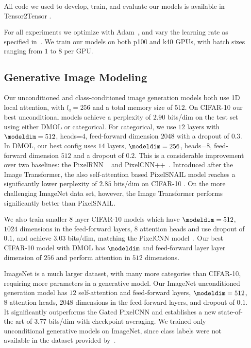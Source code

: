 All code we used to develop, train, and evaluate our models is available in Tensor2Tensor \citep{tensor2tensor}.

For all experiments we optimize with Adam~\citep{kingma2014adam}, and vary the learning rate as specified in~\cite{aiayn}. We train our models on both p100 and k40 GPUs, with batch sizes ranging from $1$ to $8$ per GPU.



\subsection{Generative Image Modeling}
Our unconditioned and class-conditioned image generation models both use 1D local attention, with $l_q=256$ and a total memory size of $512$.
On CIFAR-10 our best unconditional models achieve a perplexity of $2.90$ bits/dim on the test set using either DMOL or categorical. For categorical, we use $12$ layers with $\modeldim=512$, heads=$4$, feed-forward dimension $2048$ with a dropout of $0.3$. In DMOL, our best config uses $14$ layers, $\modeldim=256$, heads=$8$, feed-forward dimension $512$ and a dropout of $0.2$. This is a considerable improvement over two baselines: the PixelRNN ~\cite{PixelRNN} and PixelCNN++~\cite{PixelCNNpp}. Introduced after the Image Transformer, the also self-attention based PixelSNAIL model reaches a significantly lower perplexity of $2.85$ bits/dim on CIFAR-10 \cite{chen2017pixelsnail}. On the more challenging ImageNet data set, however, the Image Transformer performs significantly better than PixelSNAIL.

We also train smaller $8$ layer CIFAR-10 models which have $\modeldim=512$, $1024$ dimensions in the feed-forward layers, $8$ attention heads and use dropout of $0.1$, and achieve $3.03$ bits/dim, matching the PixelCNN model~\cite{PixelRNN}. Our best CIFAR-10 model with DMOL has $\modeldim$ and feed-forward layer layer dimension of $256$ and perform attention in $512$ dimensions.

ImageNet is a much larger dataset, with many more categories than CIFAR-10, requiring more parameters in a generative model. Our ImageNet unconditioned generation model has $12$ self-attention and feed-forward layers, $\modeldim=512$, $8$ attention heads, $2048$ dimensions in the feed-forward layers, and dropout of $0.1$. It significantly outperforms the Gated PixelCNN and establishes a new state-of-the-art of $3.77$ bits/dim with checkpoint averaging. We trained only unconditional generative models on ImageNet, since class labels were not available in the dataset provided by~\cite{PixelRNN}.

